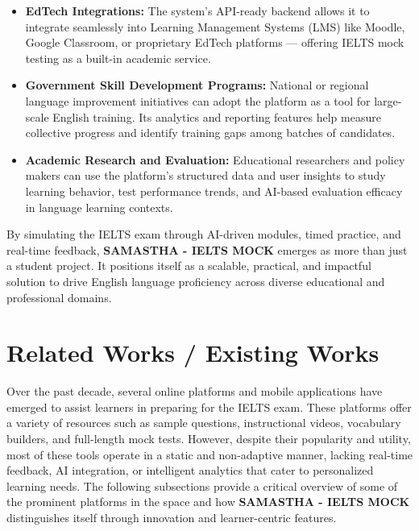 \documentclass[a4paper,12pt]{article}
\begin{document}
\begin{itemize}
    \item \textbf{EdTech Integrations:} The system’s API-ready backend allows it to integrate seamlessly into Learning Management Systems (LMS) like Moodle, Google Classroom, or proprietary EdTech platforms — offering IELTS mock testing as a built-in academic service.

    \item \textbf{Government Skill Development Programs:} National or regional language improvement initiatives can adopt the platform as a tool for large-scale English training. Its analytics and reporting features help measure collective progress and identify training gaps among batches of candidates.

    \item \textbf{Academic Research and Evaluation:} Educational researchers and policy makers can use the platform's structured data and user insights to study learning behavior, test performance trends, and AI-based evaluation efficacy in language learning contexts.
\end{itemize}

\vspace{0.3cm}

By simulating the IELTS exam through AI-driven modules, timed practice, and real-time feedback, \textbf{SAMASTHA - IELTS MOCK} emerges as more than just a student project. It positions itself as a scalable, practical, and impactful solution to drive English language proficiency across diverse educational and professional domains.


\newpage
\section{Related Works / Existing Works}

\vspace{0.5cm}

Over the past decade, several online platforms and mobile applications have emerged to assist learners in preparing for the IELTS exam. These platforms offer a variety of resources such as sample questions, instructional videos, vocabulary builders, and full-length mock tests. However, despite their popularity and utility, most of these tools operate in a static and non-adaptive manner, lacking real-time feedback, AI integration, or intelligent analytics that cater to personalized learning needs. The following subsections provide a critical overview of some of the prominent platforms in the space and how \textbf{SAMASTHA - IELTS MOCK} distinguishes itself through innovation and learner-centric features.
\end{document}
